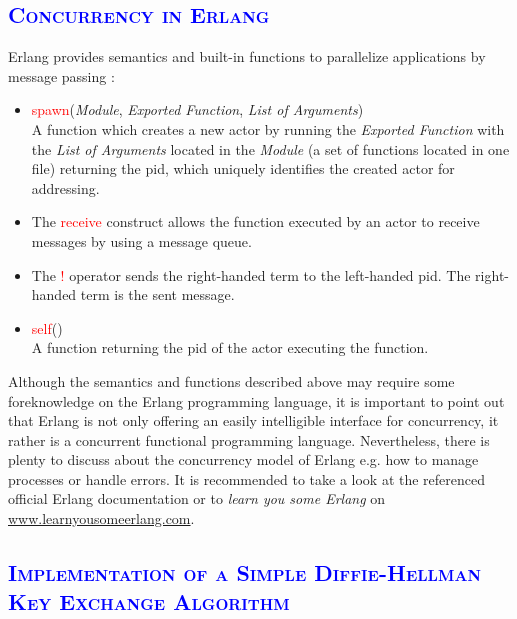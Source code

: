 \documentclass[xcolor=dvipsnames]{article}
\begin{document}
\subsection{\scshape{\textcolor{blue}{Concurrency in Erlang}}}

\noindent Erlang provides semantics and built-in functions to parallelize  applications by message passing \cite[ch. 4.3 on p. 95 - 104]{erl_doc}:

\begin{itemize}

\item \textcolor{red}{spawn}(\textit{Module}, \textit{Exported Function}, \textit{List of Arguments})\\
A function which creates a new actor by running the \textit{Exported Function} with the \textit{List of Arguments} located in the \textit{Module} (a set of functions located in one file) returning the \gls{pid}, which uniquely identifies the created actor for addressing.

\item The \textcolor{red}{receive} construct allows the function executed by an actor to receive messages by using a message queue.

\item The \textcolor{red}{!} operator sends the right-handed term to the \sloppy left-handed \gls{pid}. The right-handed term is the sent message.

\item \textcolor{red}{self}() \\
A function returning the \gls{pid} of the actor executing the function.

\end{itemize}

\noindent Although the semantics and functions described above may require some foreknowledge on the Erlang programming language, it is important to point out that Erlang is not only offering an easily intelligible interface for concurrency, it rather is a concurrent functional programming language. Nevertheless, there is plenty to discuss about the concurrency model of Erlang e.g. how to manage processes or handle errors. It is recommended to take a look at the referenced official Erlang documentation \cite{erl_doc} or to \textit{learn you some Erlang} on \url{www.learnyousomeerlang.com}.

\subsection{\scshape{\textcolor{blue}{Implementation of a Simple Diffie-Hellman Key Exchange Algorithm}}} \label{erlang_implementation}
\end{document}
